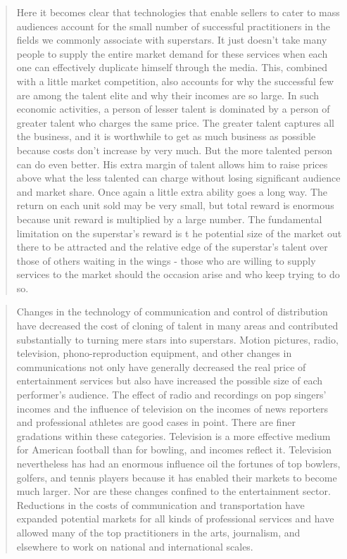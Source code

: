 \documentclass[]{book}
\theoremstyle{definition}
\theoremstyle{definition}
\theoremstyle{definition}
\theoremstyle{remark}
\begin{document}
\begin{quote}
Here it becomes clear that technologies that enable sellers to cater to
mass audiences account for the small number of successful practitioners
in the fields we commonly associate with superstars. It just doesn't
take many people to supply the entire market demand for these services
when each one can effectively duplicate himself through the media. This,
combined with a little market competition, also accounts for why the
successful few are among the talent elite and why their incomes are so
large. In such economic activities, a person of lesser talent is
dominated by a person of greater talent who charges the same price. The
greater talent captures all the business, and it is worthwhile to get as
much business as possible because costs don't increase by very much. But
the more talented person can do even better. His extra margin of talent
allows him to raise prices above what the less talented can charge
without losing significant audience and market share. Once again a
little extra ability goes a long way. The return on each unit sold may
be very small, but total reward is enormous because unit reward is
multiplied by a large number. The fundamental limitation on the
superstar's reward is t he potential size of the market out there to be
attracted and the relative edge of the superstar's talent over those of
others waiting in the wings - those who are willing to supply services
to the market should the occasion arise and who keep trying to do so.
\end{quote}

\begin{quote}
Changes in the technology of communication and control of distribution
have decreased the cost of cloning of talent in many areas and
contributed substantially to turning mere stars into superstars. Motion
pictures, radio, television, phono-reproduction equipment, and other
changes in communications not only have generally decreased the real
price of entertainment services but also have increased the possible
size of each performer's audience. The effect of radio and recordings on
pop singers' incomes and the influence of television on the incomes of
news reporters and professional athletes are good cases in point. There
are finer gradations within these categories. Television is a more
effective medium for American football than for bowling, and incomes
reflect it. Television nevertheless has had an enormous influence oil
the fortunes of top bowlers, golfers, and tennis players because it has
enabled their markets to become much larger. Nor are these changes
confined to the entertainment sector. Reductions in the costs of
communication and transportation have expanded potential markets for all
kinds of professional services and have allowed many of the top
practitioners in the arts, journalism, and elsewhere to work on national
and international scales.
\end{quote}
\end{document}
